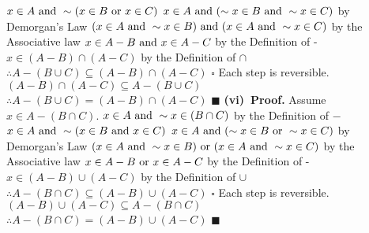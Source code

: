 \documentclass[12pt]{article}
\begin{document}
	\newline
	\(x \in A \textup{ and } \sim (x \in B \textup{ or } x \in C)\)
	\newline
	\(x \in A \textup{ and } (\sim x \in B \textup{ and } \sim x \in C)\) by Demorgan's Law
	\newline
	\((x \in A \textup{ and } \sim x \in B) \textup{ and } (x \in A \textup{ and } \sim x \in C)\) by the Associative law
	\newline
	\(x \in A - B \textup{ and } x \in A - C\) by the Definition of -
	\newline
	\(x \in (A - B) \cap (A - C)\) by the Definition of \(\cap\)
	\newline
	\(\therefore A - (B \cup C) \subseteq (A - B) \cap (A - C)\)
	\newline \(\square\) \newline
	Each step is reversible.
	\newline
	\((A - B) \cap (A - C) \subseteq A - (B \cup C)\)
	\newline
	\(\therefore A - (B \cup C) = (A - B) \cap (A - C)\)
	\newline \(\blacksquare\)
	\newline
	\textbf{(vi)\ Proof.}
	Assume \(x \in A - (B \cap C)\).
	\newline
	\(x \in A \textup{ and } \sim x \in (B \cap C)\) by the Definition of \(-\)
	\newline
	\(x \in A \textup{ and } \sim (x \in B \textup{ and } x \in C)\)
	\newline
	\(x \in A \textup{ and } (\sim x \in B \textup{ or } \sim x \in C)\) by Demorgan's Law
	\newline
	\((x \in A \textup{ and } \sim x \in B) \textup{ or } (x \in A \textup{ and } \sim x \in C)\) by the Associative law
	\newline
	\(x \in A - B \textup{ or } x \in A - C\) by the Definition of -
	\newline
	\(x \in (A - B) \cup (A - C)\) by the Definition of \(\cup\)
	\newline
	\(\therefore A - (B \cap C) \subseteq (A - B) \cup (A - C)\)
	\newline \(\square\) \newline
	Each step is reversible.
	\newline
	\((A - B) \cup (A - C) \subseteq A - (B \cap C)\)
	\newline
	\(\therefore A - (B \cap C) = (A - B) \cup (A - C)\)
	\newline \(\blacksquare\)
	\newpage
\end{document}
